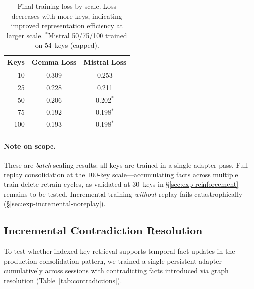 \documentclass[11pt]{article}
\begin{document}
\begin{table}[t]
\centering
\caption{Final training loss by scale. Loss decreases with more keys, indicating improved representation efficiency at larger scale. $^*$Mistral 50/75/100 trained on 54~keys (capped).}
\label{tab:loss-scale}
\small
\begin{tabular}{@{}rcc@{}}
\toprule
\textbf{Keys} & \textbf{Gemma Loss} & \textbf{Mistral Loss} \\
\midrule
10  & 0.309 & 0.253 \\
25  & 0.228 & 0.211 \\
50  & 0.206 & 0.202$^*$ \\
75  & 0.192 & 0.198$^*$ \\
100 & 0.193 & 0.198$^*$ \\
\bottomrule
\end{tabular}
\end{table}

\FloatBarrier

\paragraph{Note on scope.}
These are \emph{batch} scaling results: all keys are trained in a single adapter pass.
Full-replay consolidation at the 100-key scale---accumulating facts across multiple train-delete-retrain cycles, as validated at 30~keys in \S\ref{sec:exp-reinforcement}---remains to be tested.
Incremental training \emph{without} replay fails catastrophically (\S\ref{sec:exp-incremental-noreplay}).

\subsection{Incremental Contradiction Resolution}
\label{sec:exp-contradictions}

To test whether indexed key retrieval supports temporal fact updates in the production consolidation pattern, we trained a single persistent adapter cumulatively across sessions with contradicting facts introduced via graph resolution (Table~\ref{tab:contradictions}).
\end{document}
